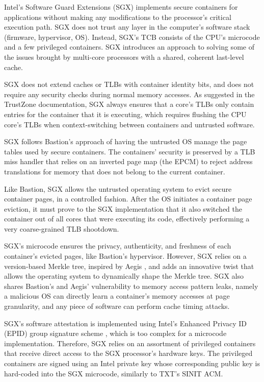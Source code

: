 
Intel's Software Guard Extensions (SGX) \cite{mckeen2013sgx, anati2013sgx,
hoekstra2013sgx} implements secure containers for applications without making
any modifications to the processor's critical execution path. SGX does not
trust any layer in the computer's software stack (firmware, hypervisor, OS).
Instead, SGX's TCB consists of the CPU's microcode and a few privileged
containers. SGX introduces an approach to solving some of the issues brought by
multi-core processors with a shared, coherent last-level cache.

SGX does not extend caches or TLBs with container identity bits, and does not
require any security checks during normal memory accesses. As suggested in the
TrustZone documentation, SGX always ensures that a core's TLBs only contain
entries for the container that it is executing, which requires flushing the CPU
core's TLBs when context-switching between containers and untrusted software.

SGX follows Bastion's approach of having the untrusted OS manage the page
tables used by secure containers. The containers' security is preserved by a
TLB miss handler that relies on an inverted page map (the EPCM) to reject
address translations for memory that does not belong to the current container.

Like Bastion, SGX allows the untrusted operating system to evict secure
container pages, in a controlled fashion. After the OS initiates a container
page eviction, it must prove to the SGX implementation that it also switched
the container out of all cores that were executing its code, effectively
performing a very coarse-grained TLB shootdown.

SGX's microcode ensures the privacy, authenticity, and freshness of each
container's evicted pages, like Bastion's hypervisor. However, SGX relies on a
version-based Merkle tree, inspired by Aegis \cite{suh2003aegis}, and adds an innovative twist
that allows the operating system to dynamically shape the Merkle tree. SGX also
shares Bastion's and Aegis' vulnerability to memory access pattern leaks, namely a
malicious OS can directly learn a container's memory accesses at page
granularity, and any piece of software can perform cache timing attacks.

SGX's software attestation is implemented using Intel's Enhanced Privacy ID
(EPID) group signature scheme \cite{brickell2009epid}, which is too complex for
a microcode implementation. Therefore, SGX relies on an assortment of
privileged containers that receive direct access to the SGX processor's
hardware keys. The privileged containers are signed using an Intel private key
whose corresponding public key is hard-coded into the SGX microcode, similarly
to TXT's SINIT ACM.

